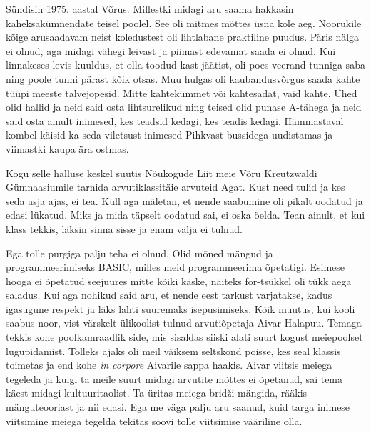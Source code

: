 
Sündisin 1975. aastal Võrus. Millestki midagi aru saama hakkasin 
kaheksakümnendate teisel poolel. See oli mitmes mõttes üsna kole 
aeg. Noorukile kõige arusaadavam neist koledustest oli lihtlabane praktiline 
puudus. Päris nälga ei olnud, aga midagi vähegi leivast ja piimast edevamat 
saada ei olnud. Kui linnakeses levis kuuldus, et olla toodud kast jäätist, oli 
poes veerand tunniga saba ning poole tunni pärast kõik otsas. Muu hulgas oli 
kaubandusvõrgus saada kahte tüüpi meeste talvejopesid. Mitte kahtekümmet või
kahtesadat, vaid kahte. Ühed olid hallid ja neid said osta lihtsurelikud ning teised olid punase A-tähega ja neid said osta 
ainult inimesed, kes teadsid kedagi, kes teadis kedagi. 
Hämmastaval kombel käisid ka seda viletsust inimesed Pihkvast bussidega 
uudistamas ja viimastki kaupa ära ostmas. 

Kogu selle halluse keskel suutis Nõukogude Liit meie Võru \linebreak[4]\mbox{Kreutzwaldi} 
Gümnaasiumile tarnida 
arvutiklassitäie arvuteid Agat. Kust need tulid ja kes 
seda asja ajas, ei tea. Küll aga mäletan, et nende saabumine oli pikalt oodatud 
ja edasi lükatud. Miks ja mida täpselt oodatud sai, ei oska öelda. Tean ainult, et 
kui klass tekkis, läksin sinna sisse ja enam välja ei tulnud. 

Ega tolle purgiga palju teha ei olnud. Olid mõned mängud ja programmeerimiseks 
BASIC, milles meid programmeerima õpetatigi. Esimese hooga ei õpetatud 
seejuures mitte kõiki käske, näiteks for-tsükkel oli tükk aega saladus. Kui aga 
nohikud said aru, et nende eest tarkust varjatakse, kadus igasugune respekt ja 
läks lahti suuremaks isepusimiseks. Kõik muutus, kui kooli saabus noor, vist
värskelt ülikoolist tulnud arvutiõpetaja Aivar 
Halapuu. Temaga tekkis kohe 
poolkamraadlik side, mis sisaldas siiski alati suurt kogust meiepoolset lugupidamist. Tolleks ajaks oli meil väiksem seltskond poisse, kes seal 
klassis toimetas ja end kohe \emph{in corpore} Aivarile sappa haakis. Aivar 
viitsis meiega tegeleda ja kuigi ta meile suurt midagi arvutite mõttes ei 
õpetanud, sai tema käest midagi kultuuritaolist. Ta
üritas meiega bridži mängida, rääkis mänguteooriast ja nii edasi. Ega me väga palju aru saanud, kuid targa inimese viitsimine meiega tegelda tekitas soovi
tolle viitsimise vääriline olla.

